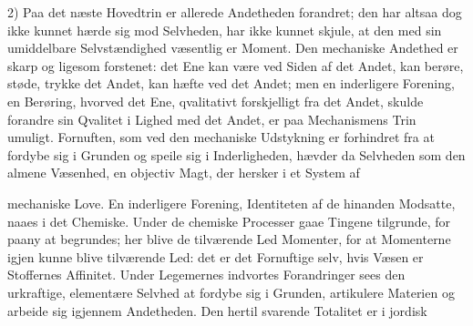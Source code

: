 \documentclass[12pt,a4paper]{book}
\begin{document}
2) Paa det næste Hovedtrin er allerede Andetheden forandret; den har
altsaa dog ikke kunnet hærde sig mod Selvheden, har ikke kunnet
skjule, at den med sin umiddelbare Selvstændighed væsentlig er Moment.
Den mechaniske Andethed er skarp og ligesom forstenet: det Ene kan
være ved Siden af det Andet, kan berøre, støde, trykke det Andet, kan
hæfte ved det Andet; men en inderligere Forening, en Berøring, hvorved
det Ene, qvalitativt forskjelligt fra det Andet, skulde forandre sin
Qvalitet i Lighed med det Andet, er paa Mechanismens Trin umuligt.
Fornuften, som ved den mechaniske Udstykning er forhindret fra at
fordybe sig i Grunden og speile sig i Inderligheden, hævder da
Selvheden som den almene Væsenhed, en objectiv Magt, der hersker i et
System af

\setcounter{footnote}{0}
mechaniske Love. En inderligere Forening, Identiteten af de hinanden
Modsatte, naaes i det Chemiske. Under de chemiske Processer gaae
Tingene tilgrunde, for paany at begrundes; her blive de tilværende Led
Momenter, for at Momenterne igjen kunne blive tilværende Led: det er
det Fornuftige selv, hvis Væsen er Stoffernes Affinitet. Under
Legemernes indvortes Forandringer sees den urkraftige, elementære
Selvhed at fordybe sig i Grunden, artikulere Materien og arbeide sig
igjennem Andetheden. Den hertil svarende Totalitet er i jordisk
\end{document}
